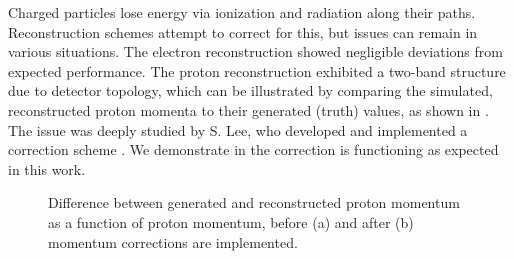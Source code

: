 Charged particles lose energy via ionization and radiation along their paths. Reconstruction schemes attempt to correct for this, but issues can remain in various situations. The electron reconstruction showed negligible deviations from expected performance. The proton reconstruction exhibited a two-band structure due to detector topology, which can be illustrated by comparing the simulated, reconstructed proton momenta to their generated (truth) values, as shown in . The issue was deeply studied by S. Lee, who developed and implemented a correction scheme \parencite{Lee2022MeasurementDetector}. We demonstrate in  the correction is functioning as expected in this work. 


    \begin{figure}[H]
        \centering
        
        \hfill
    
        \caption[Proton Momentum Correction]{Difference between generated and reconstructed proton momentum as a function of proton momentum, before (a) and after (b) momentum corrections are implemented.}\label{fig:protoncorr}
    \end{figure}

